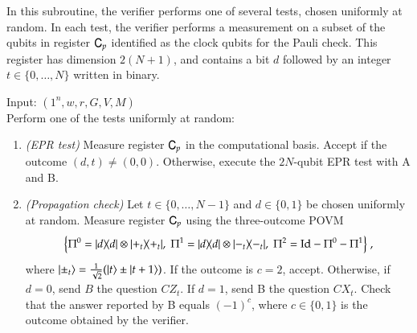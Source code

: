 	In this subroutine, the verifier performs one of several tests, chosen uniformly at random. In each test, the verifier performs a measurement on a subset of the qubits in register ${\textsf{C}}_{p}$ identified as the clock qubits for the Pauli check. This register has dimension $2(N+1)$, and contains a bit $d$ followed by an integer $t\in\{0,\ldots,N\}$ written in binary. %

\vspace{10pt}
\begin{center}
\begin{mdframed}
    Input: $(1^n,w,r,G,V,M)$ \\
    Perform one of the tests uniformly at random: 
	\begin{enumerate}
 \item \emph{(EPR test)} Measure register ${\textsf{C}}_{p}$ in the computational basis. Accept if the outcome $(d,t)\neq (0,0)$. Otherwise, execute the $2N$-qubit EPR test with A and B.\\

\item \emph{(Propagation check)} Let $t\in\{0,\ldots,N-1\}$ and $d\in\{0,1\}$ be chosen uniformly at random. Measure register ${\textsf{C}}_{p}$ using the three-outcome POVM
$$\Big\{ \Pi^0 = |d\rangle\!\langle d| \otimes |+_t\rangle\!\langle+_t|,\; \Pi^1 =  |d\rangle\!\langle d| \otimes |-_t\rangle\!\langle-_t|,\;\Pi^2 = \mathop{\mathrm{Id}}\!\mathinner{} - \Pi^0-\Pi^1 \Big\}\;,$$
where $|\pm_t\rangle = \frac{1}{\sqrt{2}}(|t\rangle\pm|t+1\rangle)$. If the outcome is $c=2$, accept. Otherwise, if $d=0$, send $B$ the question $CZ_{t}$. If $d=1$, send B the question $CX_t$. Check that the answer reported by B equals $(-1)^c$, where $c\in\{0,1\}$ is the outcome obtained by the verifier.\\


\end{enumerate}
\end{mdframed}
\end{center}
